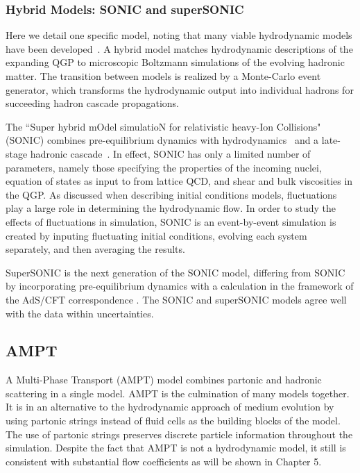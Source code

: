 \subsubsection{Hybrid Models: SONIC and superSONIC}
Here we detail one specific model, noting that many viable hydrodynamic models have been developed~\cite{Bhalerao:2014owa}.
A hybrid model matches hydrodynamic descriptions of the expanding QGP to microscopic Boltzmann simulations of the evolving hadronic matter. The transition between models is realized by a Monte-Carlo event generator, which transforms the hydrodynamic output into individual hadrons for succeeding hadron cascade propagations. 

The ``Super hybrid mOdel simulatioN for relativistic heavy-Ion Collisions" (SONIC) combines pre-equilibrium dynamics with hydrodynamics~\cite{PhysRevC.78.034915} and a late-stage hadronic cascade~\cite{PhysRevC.92.011901}. In effect, SONIC has only a limited number of parameters, namely those specifying the properties of the incoming nuclei, equation of states as input to from lattice QCD, and shear and bulk viscosities in the QGP. As discussed when describing initial conditions models, fluctuations play a large role in determining the hydrodynamic flow. In order to study the effects of fluctuations in simulation, SONIC is an event-by-event simulation is created by inputing fluctuating initial conditions, evolving each system separately, and then averaging the results.

SuperSONIC is the next generation of the SONIC model, differing from SONIC by incorporating pre-equilibrium dynamics with a calculation in the framework of the AdS/CFT correspondence \cite{Romatschke2015}. The SONIC and superSONIC models agree well with the data within uncertainties.
\subsection{AMPT}%
A Multi-Phase Transport (AMPT) model combines partonic and hadronic scattering in a single model. AMPT is the culmination of many models together. It is in an alternative to the hydrodynamic approach of medium evolution by using partonic strings instead of fluid cells as the building blocks of the model. The use of partonic strings preserves discrete particle information throughout the simulation. Despite the fact that AMPT is not a hydrodynamic model, it still is consistent with substantial flow coefficients as will be shown in Chapter 5.


